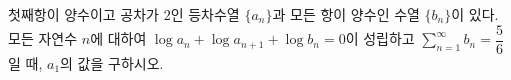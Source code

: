 첫째항이 양수이고 공차가 $2$인 등차수열 $\{a_n\}$과 모든 항이 양수인 수열 $\{b_n\}$이 있다. 모든 자연수 $n$에 대하여 $\log a_n+\log a_{n+1}+\log b_n=0$이 성립하고 $\displaystyle\sum_{n=1}^{\infty}b_n=\dfrac{5}{6}$일 때, $a_1$의 값을 구하시오.
